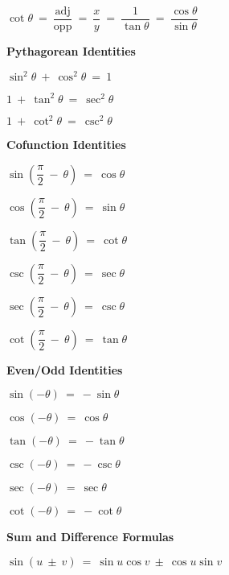 \documentclass{article}
\begin{document}
\begin{large}
\begin{multicols}{2}
{$\cot \theta\ =\ \dfrac{\text{adj}}{\text{opp}}\ =\ \dfrac{x}{y}\ =\ \dfrac{1}{\tan \theta}\ =\ \dfrac{\cos \theta}{\sin \theta}$

\textbf{Pythagorean Identities}

$\sin^{2} \theta\ +\ \cos^{2} \theta\ =\ 1$

$1\ +\ \tan^{2} \theta\ =\ \sec^{2} \theta$

$1\ +\ \cot^{2} \theta\ =\ \csc^{2} \theta$

\textbf{Cofunction Identities}

\setlength{\columnsep}{5pt}
\begin{multicols}{2}

\begin{small}

$\sin\left(\dfrac{\pi}{2}\ -\ \theta\right)\ =\ \cos \theta$

$\cos\left(\dfrac{\pi}{2}\ -\ \theta\right)\ =\ \sin \theta$

$\tan\left(\dfrac{\pi}{2}\ -\ \theta\right)\ =\ \cot \theta$

$\csc\left(\dfrac{\pi}{2}\ -\ \theta\right)\ =\ \sec \theta$

$\sec\left(\dfrac{\pi}{2}\ -\ \theta\right)\ =\ \csc \theta$

$\cot\left(\dfrac{\pi}{2}\ -\ \theta\right)\ =\ \tan \theta$

\end{small}

\end{multicols}


\textbf{Even/Odd Identities}

\begin{multicols}{2}

\begin{small}

$\sin(-\theta)\ =\ -\sin\theta$

$\cos(-\theta)\ =\ \cos\theta$

$\tan(-\theta)\ =\ -\tan\theta$

$\csc(-\theta)\ =\ -\csc\theta$

$\sec(-\theta)\ =\ \sec\theta$

$\cot(-\theta)\ =\ -\cot\theta$

\end{small}

\end{multicols}

\textbf{Sum and Difference Formulas}

$\sin(u\ \pm\ v)\ =\ \sin u \cos v\ \pm\ \cos u \sin v$

}
\end{multicols}
\end{large}
\end{document}

